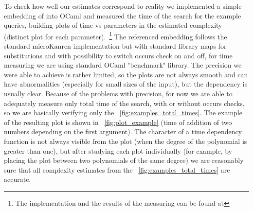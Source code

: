 To check how well our estimates correspond to reality we implemented a simple embedding of \mK into OCaml and measured the time of the search for the example queries, building plots of time vs parameters in the estimated complexity (distinct plot for each parameter).~\footnote{The implementation and the results of the measuring can be found at } The referenced embedding follows the standard microKanren implementation but with standard library maps for substitutions and with possibility to switch occurs check on and off, for time measuring we are using standard OCaml "benchmark" library. The precision we were able to achieve is rather limited, so the plots are not always smooth and can have abnormalities (especially for small sizes of the input), but the dependency is usually clear. Because of the problems with precision, for now we are able to adequately measure only total time of the search, with or without occurs checks, so we are basically verifying only the \figureword~\ref{fig:examples_total_times}. 
The example of the resulting plot is shown in \figureword~\ref{fig:plot_example} (time of addition of two numbers depending on the first argument). The character of a time dependency function is not always visible from the plot (when the degree of the polynomial is greater than one), but after studying each plot individually (for example, by placing the plot between two polynomials of the same degree) we are reasonably sure that all complexity estimates from the \figureword~\ref{fig:examples_total_times} are accurate.
